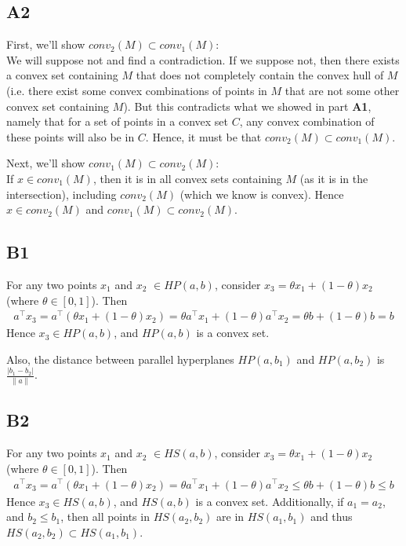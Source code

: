 \documentclass{article}
\begin{document}
\subsection{A2}
First, we'll show $conv_2(M) \subset conv_1(M)$:\\ We will suppose not and find
a contradiction. If we suppose not, then there exists a convex set containing
$M$ that does not completely contain the convex hull of $M$ (i.e. there exist
some convex combinations of points in $M$ that are not some other convex set
containing $M$). But this contradicts what we showed in part \textbf{A1},
namely that for a set of points in a convex set $C$, any convex combination of
these points will also be in $C$. Hence, it must be that $conv_2(M) \subset
conv_1(M)$.

Next, we'll show $conv_1(M) \subset conv_2(M)$:\\
If $x \in conv_1(M)$, then it is in all convex sets containing $M$ (as it is in
the intersection), including $conv_2(M)$ (which we know is convex). Hence 
$x \in conv_2(M)$ and $conv_1(M) \subset conv_2(M)$.


\subsection{B1}
For any two points $x_1$ and $x_2$ $\in HP(a,b)$, consider $x_3 = \theta x_1 +
(1-\theta) x_2$ (where $\theta \in [0,1]$). Then
\begin{align}
    a^{\top} x_3 = a^{\top} (\theta x_1 + (1-\theta) x_2) = \theta a^{\top} x_1
    + (1-\theta) a^{\top} x_2 = \theta b + (1-\theta) b = b
\end{align}
Hence $x_3 \in HP(a,b)$, and $HP(a,b)$ is a convex set.

Also, the distance between parallel hyperplanes $HP(a,b_1)$ and $HP(a,b_2)$ is
$\frac{| b_1 - b_2 |}{\|a \|}$.


\subsection{B2}
For any two points $x_1$ and $x_2$ $\in HS(a,b)$, consider $x_3 = \theta x_1 +
(1-\theta) x_2$ (where $\theta \in [0,1]$). Then
\begin{align}
    a^{\top} x_3 = a^{\top} (\theta x_1 + (1-\theta) x_2) = \theta a^{\top} x_1
    + (1-\theta) a^{\top} x_2 \leq \theta b + (1-\theta) b \leq b
\end{align}
Hence $x_3 \in HS(a,b)$, and $HS(a,b)$ is a convex set. Additionally, if $a_1 = a_2$, 
and $b_2 \leq b_1$, then all points in $HS(a_2,b_2)$ are in $HS(a_1,b_1)$ and thus 
$HS(a_2,b_2) \subset HS(a_1,b_1)$.
\end{document}
